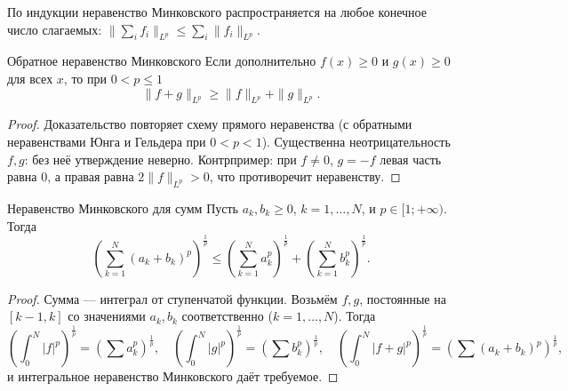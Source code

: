 \begin{Remark}{}{}
	По индукции неравенство Минковского распространяется на любое конечное число
	слагаемых: $\bigl\|\sum_{i} f_i\bigr\|_{L^p}\le\sum_{i}\|f_i\|_{L^p}$.
\end{Remark}

\begin{Proposition}{Обратное неравенство Минковского}{}
	Если дополнительно $f(x)\ge0$ и $g(x)\ge0$ для всех $x$, то при $0<p\le1$
	\[
	\|f+g\|_{L^p}\ge \|f\|_{L^p}+\|g\|_{L^p}.
	\]
\end{Proposition}

\begin{proof}
	Доказательство повторяет схему прямого неравенства (с обратными
	неравенствами Юнга и Гельдера при $0<p<1$). Существенна неотрицательность
	$f,g$: без неё утверждение неверно. Контрпример: при $f\ne0$, $g=-f$ левая
	часть равна $0$, а правая равна $2\|f\|_{L^p}>0$, что противоречит
	неравенству.
\end{proof}

\begin{Proposition}{Неравенство Минковского для сумм}{}
	Пусть $a_k,b_k\ge0$, $k=1,\dots,N$, и $p\in[1;+\infty)$. Тогда
	\[
	\left(\sum_{k=1}^N (a_k+b_k)^p\right)^{\frac1p}
	\le
	\left(\sum_{k=1}^N a_k^p\right)^{\frac1p}
	+\left(\sum_{k=1}^N b_k^p\right)^{\frac1p}.
	\]
\end{Proposition}

\begin{proof}
	Сумма --- интеграл от ступенчатой функции. Возьмём $f,g$, постоянные на
	$[k-1,k]$ со значениями $a_k,b_k$ соответственно ($k=1,\dots,N$). Тогда
	\[
	\left(\int_0^N|f|^p\right)^{\frac1p}=\left(\sum a_k^p\right)^{\frac1p},
	\quad
	\left(\int_0^N|g|^p\right)^{\frac1p}=\left(\sum b_k^p\right)^{\frac1p},
	\quad
	\left(\int_0^N|f+g|^p\right)^{\frac1p}=\left(\sum (a_k+b_k)^p\right)^{\frac1p},
	\]
	и интегральное неравенство Минковского даёт требуемое.
\end{proof}
